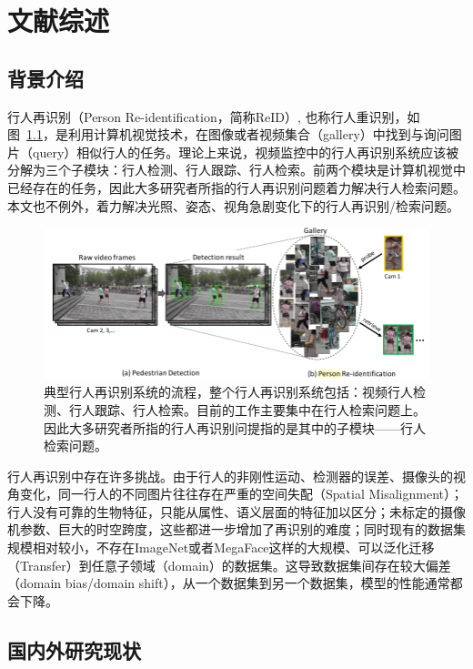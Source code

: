 \chapter{文献综述}

\section{背景介绍}

\indent 行人再识别（Person Re-identification，简称ReID）, 也称行人重识别\cite{zheng2016person}，如图~\ref{figure:background}，是利用计算机视觉技术，在图像或者视频集合（gallery）中找到与询问图片（query）相似行人的任务。理论上来说，视频监控中的行人再识别系统应该被分解为三个子模块：行人检测、行人跟踪、行人检索。前两个模块是计算机视觉中已经存在的任务，因此大多研究者所指的行人再识别问题着力解决行人检索问题\cite{zheng2017person}。本文也不例外，着力解决光照、姿态、视角急剧变化下的行人再识别/检索问题。

\begin{figure}[!htbp]
    \centering
    \includegraphics[width=\linewidth,keepaspectratio]{data/kaitibaogao/background.png}
    \caption{典型行人再识别系统的流程，整个行人再识别系统包括：视频行人检测、行人跟踪、行人检索。目前的工作主要集中在行人检索问题上。因此大多研究者所指的行人再识别问提指的是其中的子模块——行人检索问题。}
    \label{figure:background}
\end{figure}

行人再识别中存在许多挑战。由于行人的非刚性运动、检测器的误差、摄像头的视角变化，同一行人的不同图片往往存在严重的空间失配（Spatial Misalignment）；行人没有可靠的生物特征，只能从属性、语义层面的特征加以区分；未标定的摄像机参数、巨大的时空跨度，这些都进一步增加了再识别的难度；同时现有的数据集规模相对较小，不存在ImageNet或者MegaFace这样的大规模、可以泛化迁移（Transfer）到任意子领域（domain）的数据集。这导致数据集间存在较大偏差（domain bias/domain shift），从一个数据集到另一个数据集，模型的性能通常都会下降。

\section{国内外研究现状}

